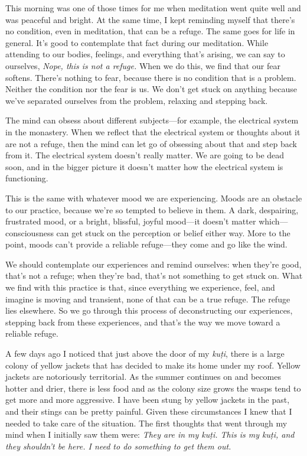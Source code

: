 
This morning was one of those times for me when meditation went quite 
well and was peaceful and bright. At the same time, I kept reminding 
myself that there's no condition, even in meditation, that can be a 
refuge. The same goes for life in general. It's good to contemplate 
that fact during our meditation. While attending to our bodies, 
feelings, and everything that's arising, we can say to ourselves, 
\emph{Nope, this is not a refuge.} When we do this, we find that our 
fear softens. There's nothing to fear, because there is no condition 
that is a problem. Neither the condition nor the fear is us. We don't 
get stuck on anything because we've separated ourselves from the 
problem, relaxing and stepping back.

The mind can obsess about different subjects---for example, the 
electrical system in the monastery. When we reflect that the electrical 
system or thoughts about it are not a refuge, then the mind can let go 
of obsessing about that and step back from it. The electrical system 
doesn't really matter. We are going to be dead soon, and in the bigger 
picture it doesn't matter how the electrical system is functioning.

This is the same with whatever mood we are experiencing. Moods are an 
obstacle to our practice, because we're so tempted to believe in them. 
A dark, despairing, frustrated mood, or a bright, blissful, joyful 
mood---it doesn't matter which---consciousness can get stuck on the 
perception or belief either way. More to the point, moods can't provide 
a reliable refuge---they come and go like the wind.

We should contemplate our experiences and remind ourselves: when 
they're good, that's not a refuge; when they're bad, that's not 
something to get stuck on. What we find with this practice is that, 
since everything we experience, feel, and imagine is moving and 
transient, none of that can be a true refuge. The refuge lies 
elsewhere. So we go through this process of deconstructing our 
experiences, stepping back from these experiences, and that's the way 
we move toward a reliable refuge.


A few days ago I noticed that just above the door of my \emph{kuṭi}, 
there is a large colony of yellow jackets that has decided to make its 
home under my roof. Yellow jackets are notoriously territorial. As the 
summer continues on and becomes hotter and drier, there is less food 
and as the colony size grows the wasps tend to get more and more 
aggressive. I have been stung by yellow jackets in the past, and their 
stings can be pretty painful. Given these circumstances I knew that I 
needed to take care of the situation. The first thoughts that went 
through my mind when I initially saw them were: \emph{They are in my 
kuṭi. This is my kuṭi, and they shouldn't be here. I need to do 
something to get them out.}

